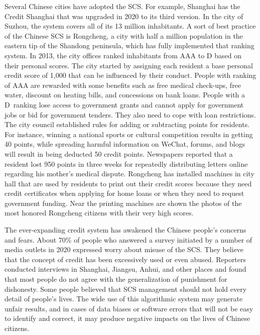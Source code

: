 Several Chinese cities have adopted the SCS. For example, Shanghai has the Credit Shanghai that was upgraded in 2020 to its third version. In the city of Suzhou, the system covers all of its 13 million inhabitants. A sort of best practice of the Chinese SCS is Rongcheng, a city with half a million population in the eastern tip of the Shandong peninsula, which has fully implemented that ranking system. In 2013, the city offices ranked inhabitants from AAA to D based on their personal scores. The city started by assigning each resident a base personal credit score of 1,000 that can be influenced by their conduct. People with ranking of AAA are rewarded with some benefits such as free medical check-ups, free water, discount on heating bills, and concessions on bank loans. People with a \hbox{D ranking} lose access to government grants and cannot apply for government jobs or bid for government tenders. They also need to cope with loan restrictions. The city council established rules for adding or subtracting points for residents. For instance, winning a national sports or cultural competition results in getting 40 points, while spreading harmful information on WeChat, forums, and blogs will result in being deducted 50 credit points. Newspapers reported that a resident lost 950 points in three weeks for repeatedly distributing letters online regarding his mother's medical dispute. Rongcheng has installed machines in city hall that are used by residents to print out their credit scores because they need credit certificates when applying for home loans or when they need to request government funding. Near the printing machines are shown the photos of the most honored Rongcheng citizens with their very high scores.

The ever-expanding credit system has awakened the Chinese people's concerns and fears. About 70\% of people who answered a survey initiated by a number of media outlets in 2020 expressed worry about misuse of the SCS. They believe that the concept of credit has been excessively used or even abused. Reporters \hbox{conducted} interviews in Shanghai, Jiangsu, Anhui, and other places and found that most people do not agree with the generalization of punishment for dishonesty. Some people believed that SCS management should not hold every detail of people's lives. The wide use of this algorithmic system may generate unfair results, and in cases of data biases or software errors that will not be easy to identify and correct, it may produce negative impacts on the lives of Chinese citizens.

